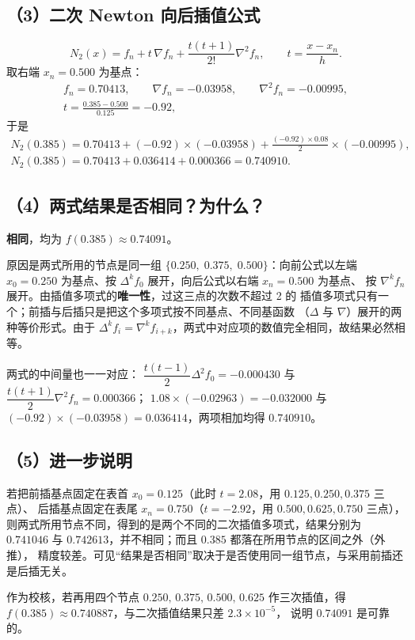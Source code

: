 \documentclass[a4paper,11pt]{ctexart}
\begin{document}
\subsection*{（3）二次 Newton 向后插值公式}
\[
  N_2(x)=f_n+t\,\nabla f_n+\frac{t(t+1)}{2!}\nabla^{2}f_n,
  \qquad t=\frac{x-x_n}{h}.
\]
取右端 $x_n=0.500$ 为基点：
\begin{gather*}
  f_n=0.70413,\qquad \nabla f_n=-0.03958,\qquad \nabla^{2}f_n=-0.00995,\\
  t=\frac{0.385-0.500}{0.125}=-0.92 ,
\end{gather*}
于是
\begin{gather*}
  N_2(0.385)=0.70413+(-0.92)\times(-0.03958)
             +\frac{(-0.92)\times 0.08}{2}\times(-0.00995),\\
  N_2(0.385)=0.70413+0.036414+0.000366=0.740910 .
\end{gather*}

\subsection*{（4）两式结果是否相同？为什么？}
\textbf{相同}，均为 $f(0.385)\approx 0.74091$。

原因是两式所用的节点是同一组 $\{0.250,\;0.375,\;0.500\}$：向前公式以左端
$x_0=0.250$ 为基点、按 $\Delta^{k}f_0$ 展开，向后公式以右端 $x_n=0.500$ 为基点、
按 $\nabla^{k}f_n$ 展开。由插值多项式的\textbf{唯一性}，过这三点的次数不超过 2 的
插值多项式只有一个；前插与后插只是把这个多项式按不同基点、不同基函数
（$\Delta$ 与 $\nabla$）展开的两种等价形式。由于
$\Delta^{k}f_i=\nabla^{k}f_{i+k}$，两式中对应项的数值完全相同，故结果必然相等。

{\small 两式的中间量也一一对应：
$\dfrac{t(t-1)}{2}\Delta^{2}f_0=-0.000430$ 与
$\dfrac{t(t+1)}{2}\nabla^{2}f_n=0.000366$；
$1.08\times(-0.02963)=-0.032000$ 与
$(-0.92)\times(-0.03958)=0.036414$，两项相加均得 $0.740910$。}

\subsection*{（5）进一步说明}
若把前插基点固定在表首 $x_0=0.125$（此时 $t=2.08$，用 $0.125,0.250,0.375$ 三点）、
后插基点固定在表尾 $x_n=0.750$（$t=-2.92$，用 $0.500,0.625,0.750$ 三点），
则两式所用节点不同，得到的是两个不同的二次插值多项式，结果分别为
$0.741046$ 与 $0.742613$，并不相同；而且 $0.385$ 都落在所用节点的区间之外（外推），
精度较差。可见“结果是否相同”取决于是否使用同一组节点，与采用前插还是后插无关。

作为校核，若再用四个节点 $0.250,\,0.375,\,0.500,\,0.625$ 作三次插值，得
$f(0.385)\approx 0.740887$，与二次插值结果只差 $2.3\times10^{-5}$，
说明 $0.74091$ 是可靠的。
\end{document}

